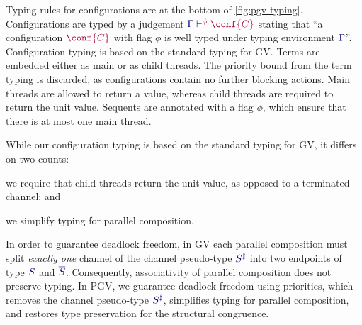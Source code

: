 \documentclass[main.tex]{subfiles}
\begin{document}
\begin{mathpar}
  \small
\end{mathpar}

Typing rules for configurations are at the bottom of \cref{fig:pgv-typing}. Configurations are typed by a judgement $\cseq[\phi]{\ty{\Gamma}}{\conf{C}}$ stating that ``a configuration $\tm{\conf{C}}$ with flag $\phi$ is well typed under typing environment $\ty{\Gamma}$''. Configuration typing is based on the standard typing for GV. Terms are embedded either as main or as child threads. The priority bound from the term typing is discarded, as configurations contain no further blocking actions. Main threads are allowed to return a value, whereas child threads are required to return the unit value. Sequents are annotated with a flag $\phi$, which ensure that there is at most one main thread.

While our configuration typing is based on the standard typing for GV, it differs on two counts:
\begin{enumerate*}[label=(\roman*)]
\item we require that child threads return the unit value, as opposed to a terminated channel; and
\item we simplify typing for parallel composition.
\end{enumerate*}
In order to guarantee deadlock freedom, in GV each parallel composition must split \emph{exactly one} channel of the channel pseudo-type $\ty{S^\sharp}$ into two endpoints of type $\ty{S}$ and $\ty{\co{S}}$. Consequently, associativity of parallel composition does not preserve typing. In PGV, we guarantee deadlock freedom using priorities, which removes the channel pseudo-type $\ty{S^\sharp}$, simplifies typing for parallel composition, and restores type preservation for the structural congruence.
\end{document}
